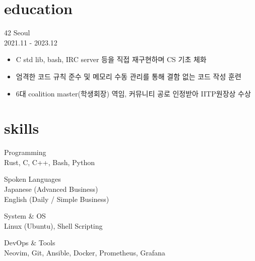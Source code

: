 \documentclass[10pt, a4paper]{article}
\newcommand{\descstyle}{\lightfont\fontsize{9.5pt}{10pt}\selectfont}
\newcommand{\dates}[1]{\hfill {\descstyle\color{lightGray} #1}}
\begin{document}
\noindent
\begin{minipage}[t]{0.34\textwidth} %

    \section*{\huge{education}}
    42 Seoul \\ 
    \dates{2021.11 - 2023.12}
    \vspace{0.3em}
    
    {\descstyle
    \begin{itemize}[label=\textbullet]
        \item C std lib, bash, IRC server 등을 직접 재구현하며 CS 기초 체화
        \item 엄격한 코드 규칙 준수 및 메모리 수동 관리를 통해 결함 없는 코드 작성 훈련
        \item 6대 coalition master(학생회장) 역임, 커뮤니티 공로 인정받아 IITP원장상 수상
    \end{itemize}
    }


    \vspace{1.5em} %

    \section*{\huge{skills}}
   
    Programming \\
    {\descstyle Rust, C, C++, Bash, Python }
  
    \vspace{0.5em} %
    
    Spoken Languages \\
    {\descstyle Japanese (Advanced Business) \\
    English (Daily / Simple Business) }      

    \vspace{0.5em} %
    System \& OS \\
    {\descstyle Linux (Ubuntu), Shell Scripting }
    
    \vspace{0.5em} %
    DevOps \& Tools \\
    {\descstyle Neovim, Git, Ansible, Docker, Prometheus, Grafana }

 
    \vspace{1.5em}

\end{minipage}
\end{document}
